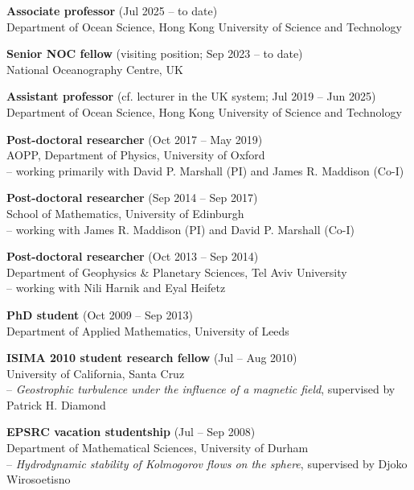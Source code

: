 \documentclass[letterpaper]{article}
\renewenvironment{itemize}{
  \begin{list}{}{
    \setlength{\leftmargin}{1.5em}
  }
}{
  \end{list}
}
\begin{document}
\begin{itemize}


\item \textbf{Associate professor} (Jul 2025 -- to date)\\
Department of Ocean Science, Hong Kong University of Science and Technology

\item \textbf{Senior NOC fellow} (visiting position; Sep 2023 -- to date)\\
National Oceanography Centre, UK

\item \textbf{Assistant professor} (cf. lecturer in the UK system; Jul 2019 -- Jun 2025)\\
Department of Ocean Science, Hong Kong University of Science and Technology

\item \textbf{Post-doctoral researcher} (Oct 2017 -- May 2019)\\
AOPP, Department of Physics, University of Oxford\\
-- working primarily with David P. Marshall (PI) and James R. Maddison (Co-I) 

\item \textbf{Post-doctoral researcher} (Sep 2014 -- Sep 2017)\\
School of Mathematics, University of Edinburgh\\
-- working with James R. Maddison (PI) and David P. Marshall (Co-I)

\item \textbf{Post-doctoral researcher} (Oct 2013 -- Sep 2014)\\
Department of Geophysics \& Planetary Sciences, Tel Aviv University\\
-- working with Nili Harnik and Eyal Heifetz

\item \textbf{PhD student}  (Oct 2009 -- Sep 2013)\\
Department of Applied Mathematics, University of Leeds
	
\item \textbf{ISIMA 2010 student research fellow} (Jul -- Aug 2010)\\
University of California, Santa Cruz\\
-- \textit{Geostrophic turbulence under the influence of a magnetic field},
supervised by Patrick H. Diamond
	
\item \textbf{EPSRC vacation studentship} (Jul -- Sep 2008)\\
Department of Mathematical Sciences, University of Durham\\
-- \textit{Hydrodynamic stability of Kolmogorov flows on the sphere},
supervised by Djoko Wirosoetisno
	
\end{itemize}
\end{document}

